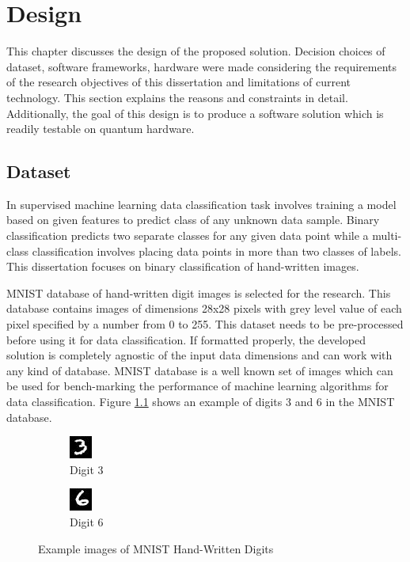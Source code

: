 \documentclass[english,a4paper,11pt,oneside,onecolumn]{book}
\begin{document}
\chapter{Design}
\label{sec:desgn}
This chapter discusses the design of the proposed solution. Decision choices of dataset, software frameworks, hardware were made considering the requirements of the research objectives of this dissertation and limitations of current technology. This section explains the reasons and constraints in detail. Additionally, the goal of this design is to produce a software solution which is readily testable on quantum hardware.

\section{Dataset}
\label{sec:dataset}
In supervised machine learning data classification task involves training a model based on given features to predict class of any unknown data sample. Binary classification predicts two separate classes for any given data point while a multi-class classification involves placing data points in more than two classes of labels. This dissertation focuses on binary classification of hand-written images. 

MNIST database \cite{kussul_2004_improved} of hand-written digit images is selected for the research. This database contains images of dimensions 28x28 pixels with grey level value of each pixel specified by a number from 0 to 255. This dataset needs to be pre-processed before using it for data classification. If formatted properly, the developed solution is completely agnostic of the input data dimensions and can work with any kind of database. MNIST database is a well known set of images which can be used for bench-marking the performance of machine learning algorithms for data classification. Figure \ref{fig:mnistEg} shows an example of digits 3 and 6 in the MNIST database.

\begin{figure}[H]
    \begin{subfigure}{0.5\textwidth}
    \begin{center}
    \includegraphics[width=0.1\linewidth]{Images/mnist_example_digit_3.jpg}
    \end{center}
    \caption{Digit 3}
    \end{subfigure}
    \begin{subfigure}{0.5\textwidth}
    \begin{center}
    \includegraphics[width=0.1\linewidth]{Images/mnist_example_digit_6.jpg}
    \end{center}
    \caption{Digit 6}
    \end{subfigure}
    \caption{Example images of MNIST Hand-Written Digits}
    \label{fig:mnistEg}
\end{figure}
\end{document}
